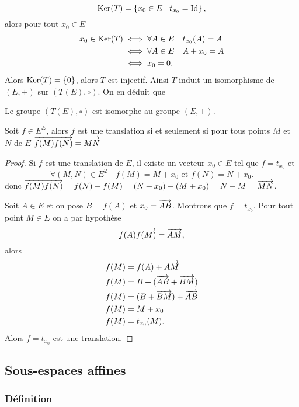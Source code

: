 \begin{equation}
  \operatorname{Ker}(T)= \left\{x_0 \in E\mathrel{}\middle|\mathrel{}t_{x_0} = \operatorname{Id}\right\},
\end{equation}
alors pour tout \(x_0 \in E\)
\begin{align}
  x_0 \in \operatorname{Ker}(T) &\iff \forall A \in E \quad t_{x_0}(A)=A\\
  &\iff \forall A \in E \quad A+x_0=A \\
  &\iff x_0=0.
\end{align}
Alors \(\operatorname{Ker}(T)=\{0\}\), alors \(T\) est injectif. Ainsi \(T\) induit un isomorphisme de \((E,+)\) sur \((T(E),\circ)\). On en déduit que
\begin{prop}
  Le groupe \((T(E),\circ)\) est isomorphe au groupe \((E,+)\).
\end{prop}
%
\begin{theo}
  Soit \(f \in E^E\), alors \(f\) est une translation si et seulement si pour tous points \(M\) et \(N\) de \(E\) \(\overrightarrow{f(M)f(N)}=\overrightarrow{MN}\)
\end{theo}
\begin{proof}
  Si \(f\) est une translation de \(E\), il existe un vecteur \(x_0 \in E\) tel que \(f=t_{x_0}\) et
  \begin{equation}
    \forall (M, N) \in E^2 \quad f(M)=M+x_0 \text{~et~} f(N)=N+x_0.
  \end{equation}
  donc \(\overrightarrow{f(M)f(N)}=f(N)-f(M)=(N+x_0)-(M+x_0)=N-M=\overrightarrow{MN}\).

  Soit \(A \in E\) et on pose \(B=f(A)\) et \(x_0=\overrightarrow{AB}\). Montrons que \(f=t_{x_0}\). Pour tout point \(M \in E\) on a par hypothèse
  \begin{equation}
    \overrightarrow{f(A)f(M)}=\overrightarrow{AM},
  \end{equation}
  alors
  \begin{align}
   f(M)&=f(A)+\overrightarrow{AM} \\
   f(M)&=B+(\overrightarrow{AB}+\overrightarrow{BM}) \\
   f(M)&=(B+\overrightarrow{BM})+\overrightarrow{AB} \\
   f(M)&=M+x_0\\
   f(M)&=t_{x_0}(M).
  \end{align}
  Alors \(f=t_{x_0}\) est une translation.
\end{proof}

\subsection{Sous-espaces affines}

\subsubsection{Définition}


